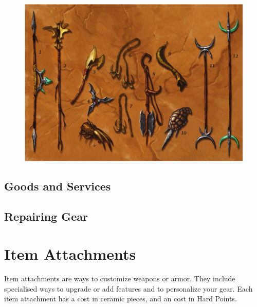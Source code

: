 \begin{figure}[!htb]
\centering
\includegraphics[width=0.8\linewidth]{images/weapons.png}
\end{figure}





\subsection{Goods and Services}





\subsection{Repairing Gear}

\section{Item Attachments}

Item attachments are ways to customize weapons or armor. They include specialised
ways to upgrade or add features and to personalize your gear. Each item attachment
has a cost in ceramic pieces, and an cost in Hard Points.

